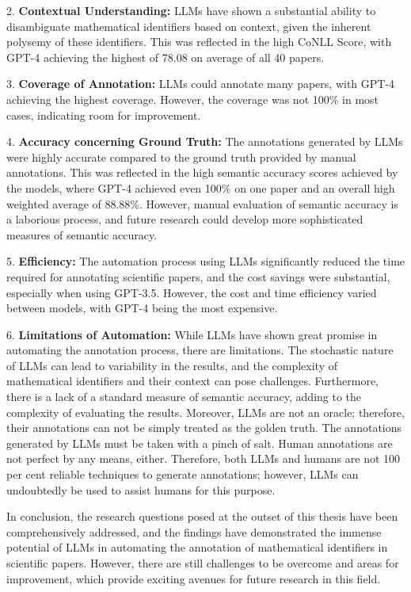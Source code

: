 2. \textbf{Contextual Understanding:} LLMs have shown a substantial ability to disambiguate mathematical identifiers based on context, given the inherent polysemy of these identifiers. This was reflected in the high CoNLL Score, with GPT-4 achieving the highest of 78.08 on average of all 40 papers.

3. \textbf{Coverage of Annotation:} LLMs could annotate many papers, with GPT-4 achieving the highest coverage. However, the coverage was not 100\% in most cases, indicating room for improvement.

4. \textbf{Accuracy concerning Ground Truth:} The annotations generated by LLMs were highly accurate compared to the ground truth provided by manual annotations. This was reflected in the high semantic accuracy scores achieved by the models, where GPT-4 achieved even 100\% on one paper and an overall high weighted average of 88.88\%. However, manual evaluation of semantic accuracy is a laborious process, and future research could develop more sophisticated measures of semantic accuracy.

5. \textbf{Efficiency:} The automation process using LLMs significantly reduced the time required for annotating scientific papers, and the cost savings were substantial, especially when using GPT-3.5. However, the cost and time efficiency varied between models, with GPT-4 being the most expensive.

6. \textbf{Limitations of Automation:} While LLMs have shown great promise in automating the annotation process, there are limitations. The stochastic nature of LLMs can lead to variability in the results, and the complexity of mathematical identifiers and their context can pose challenges. Furthermore, there is a lack of a standard measure of semantic accuracy, adding to the complexity of evaluating the results. Moreover, \ac{LLMs} are not an oracle; therefore, their annotations can not be simply treated as the golden truth. The annotations generated by \ac{LLMs} must be taken with a pinch of salt. Human annotations are not perfect by any means, either. Therefore, both LLMs and humans are not 100 per cent reliable techniques to generate annotations; however, LLMs can undoubtedly be used to assist humans for this purpose.

In conclusion, the research questions posed at the outset of this thesis have been comprehensively addressed, and the findings have demonstrated the immense potential of LLMs in automating the annotation of mathematical identifiers in scientific papers. However, there are still challenges to be overcome and areas for improvement, which provide exciting avenues for future research in this field.
